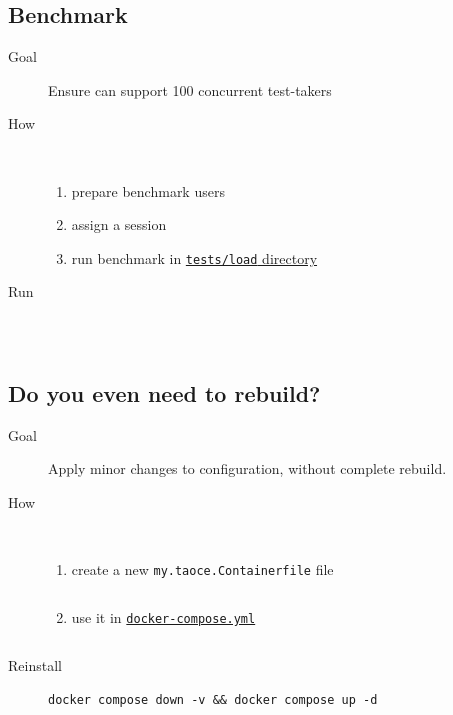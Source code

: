 \subsection{Benchmark \taoce}
\begin{frame}[fragile=singleslide]
    \begin{description}
    \item[Goal] Ensure \taoce can support 100 concurrent test-takers
    \item[How] \, \begin{enumerate}
        \item prepare benchmark users
        \item assign a session
        \item run benchmark in \href{https://github.com/tao-ce/tao-ce/tree/main/tests/load}{\texttt{tests/load} directory}
    \end{enumerate}
    \item[Run] \, \inputminted{bash}{./snippets/locust.sh}
    \end{description}
\end{frame}
\subsection{Do you even need to rebuild?}
\begin{frame}[fragile=singleslide]
    \begin{description}
    \item[Goal] Apply minor changes to \taoce configuration, without complete rebuild.
    \item[How] \, \begin{enumerate}
        \item create a new \texttt{my.taoce.Containerfile} file \inputminted{Dockerfile}{./snippets/my.taoce.Containerfile}
        \item use it in \href{https://github.com/tao-ce/tao-ce/blob/837b29614f205a40918327fa478b5c0170e5b6d1/docker-compose.yml#L9}{\texttt{docker-compose.yml}}
    \inputminted{yaml}{./snippets/dc.yaml}
    \end{enumerate}
    \item[Reinstall] \texttt{docker compose down -v && docker compose up -d}
    \end{description}
\end{frame}
